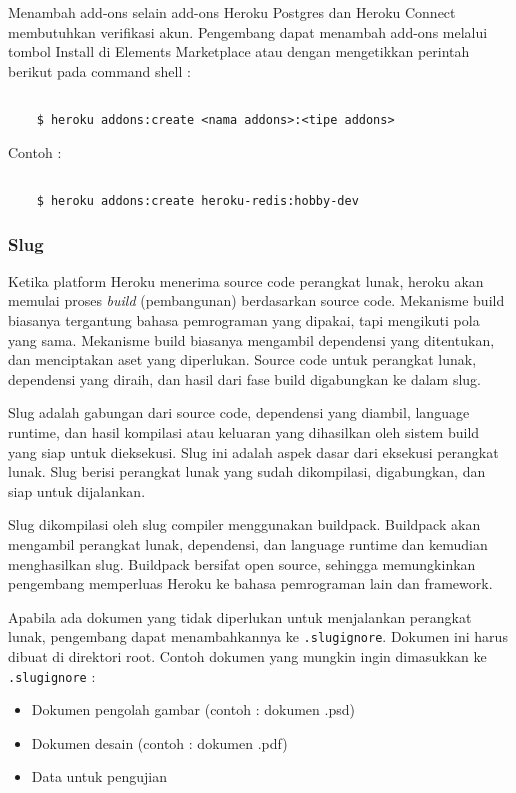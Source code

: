 Menambah add-ons selain add-ons Heroku Postgres dan Heroku Connect membutuhkan verifikasi akun. Pengembang dapat menambah add-ons melalui tombol Install di Elements Marketplace atau dengan mengetikkan perintah berikut pada command shell :
\begin{lstlisting}

	$ heroku addons:create <nama addons>:<tipe addons>

\end{lstlisting}
Contoh :
\begin{lstlisting}

	$ heroku addons:create heroku-redis:hobby-dev

\end{lstlisting}

\subsubsection{Slug}
Ketika platform Heroku menerima source code perangkat lunak, heroku akan memulai proses \textit{build} (pembangunan) berdasarkan source code. Mekanisme build biasanya tergantung bahasa pemrograman yang dipakai, tapi mengikuti pola yang sama. Mekanisme build biasanya mengambil dependensi yang ditentukan, dan menciptakan aset yang diperlukan. Source code untuk perangkat lunak, dependensi yang diraih, dan hasil dari fase build digabungkan ke dalam slug. 

Slug adalah gabungan dari source code, dependensi yang diambil, language runtime, dan hasil kompilasi atau keluaran yang dihasilkan oleh sistem build yang siap untuk dieksekusi. Slug ini adalah aspek dasar dari eksekusi perangkat lunak. Slug berisi perangkat lunak yang sudah dikompilasi, digabungkan, dan siap untuk dijalankan.

Slug dikompilasi oleh slug compiler menggunakan buildpack. Buildpack akan mengambil perangkat lunak, dependensi, dan language runtime dan kemudian menghasilkan slug. Buildpack bersifat open source, sehingga memungkinkan pengembang memperluas Heroku ke bahasa pemrograman lain dan framework.

Apabila ada dokumen yang tidak diperlukan untuk menjalankan perangkat lunak, pengembang dapat menambahkannya ke \texttt{.slugignore}. Dokumen ini harus dibuat di direktori root. Contoh dokumen yang mungkin ingin dimasukkan ke \texttt{.slugignore} :
\begin{itemize}
\item Dokumen pengolah gambar (contoh : dokumen .psd)
\item Dokumen desain (contoh : dokumen .pdf)
\item Data untuk pengujian
\end{itemize}


